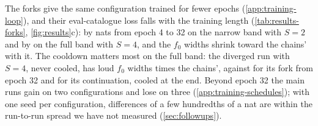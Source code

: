 The forks give the same configuration trained for fewer epochs (\cref{app:training-loop}), and their
eval-catalogue loss falls with the training length (\cref{tab:results-forks},
\cref{fig:results}c): by \ResultsNarrowTwoForkGain{} nats from epoch 4 to 32 on the narrow band with
$S=2$ and by \ResultsFullFourForkGain{} on the full band with $S=4$, and the $f_0$ widths shrink
toward the chains' with it. The cooldown matters most on the full band: the diverged run with
$S=4$, never cooled, has loud $f_0$ widths \ResultsFullFourMainLoud{} times the chains', against
\ResultsFullFourForkLoud{} for its fork from epoch 32 and \ResultsFullFourContLoud{} for its
continuation, cooled at the end. Beyond epoch 32 the main runs gain on two configurations and lose
on three (\cref{app:training-schedules}); with one seed per configuration, differences of a few
hundredths of a nat are within the run-to-run spread we have not measured (\cref{sec:followups}).
